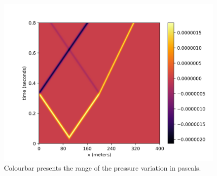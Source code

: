 \documentclass[]{article}
\begin{document}
\begin{figure}[H]
	\centering
	\includegraphics[width=1.0\linewidth]{media/plot_2_regions}
	\caption{Colourbar presents the range of the pressure variation in pascals.}
	\label{fig:plot2regions}
\end{figure} 
 
\end{document}
